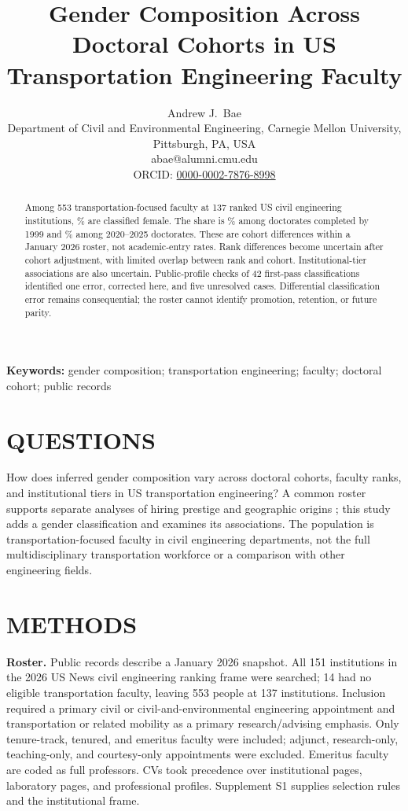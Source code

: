 \documentclass[11pt]{article}
\title{\textbf{Gender Composition Across Doctoral Cohorts in US Transportation Engineering Faculty}}
\author{Andrew J.\ Bae\\[2pt]\small Department of Civil and Environmental Engineering, Carnegie Mellon University, Pittsburgh, PA, USA\\\small abae@alumni.cmu.edu\\\small ORCID: \href{https://orcid.org/0000-0002-7876-8998}{0000-0002-7876-8998}}
\date{}
\begin{document}
\maketitle
\begin{abstract}
Among 553 transportation-focused faculty at 137 ranked US civil engineering institutions, \FemaleShare\% are classified female. The share is \CohortOneFemaleShare\% among doctorates completed by 1999 and \CohortFourFemaleShare\% among 2020--2025 doctorates. These are cohort differences within a January 2026 roster, not academic-entry rates. Rank differences become uncertain after cohort adjustment, with limited overlap between rank and cohort. Institutional-tier associations are also uncertain. Public-profile checks of 42 first-pass classifications identified one error, corrected here, and five unresolved cases. Differential classification error remains consequential; the roster cannot identify promotion, retention, or future parity.
\end{abstract}
\noindent\textbf{Keywords:} gender composition; transportation engineering; faculty; doctoral cohort; public records

\section*{QUESTIONS}
How does inferred gender composition vary across doctoral cohorts, faculty ranks, and institutional tiers in US transportation engineering? A common roster supports separate analyses of hiring prestige and geographic origins \citep{bae2026a,bae2026b}; this study adds a gender classification and examines its associations. The population is transportation-focused faculty in civil engineering departments, not the full multidisciplinary transportation workforce or a comparison with other engineering fields.

\section*{METHODS}
\textbf{Roster.} Public records describe a January 2026 snapshot. All 151 institutions in the 2026 US News civil engineering ranking frame were searched; 14 had no eligible transportation faculty, leaving 553 people at 137 institutions. Inclusion required a primary civil or civil-and-environmental engineering appointment and transportation or related mobility as a primary research/advising emphasis. Only tenure-track, tenured, and emeritus faculty were included; adjunct, research-only, teaching-only, and courtesy-only appointments were excluded. Emeritus faculty are coded as full professors. CVs took precedence over institutional pages, laboratory pages, and professional profiles. Supplement S1 supplies selection rules and the institutional frame.
\end{document}
